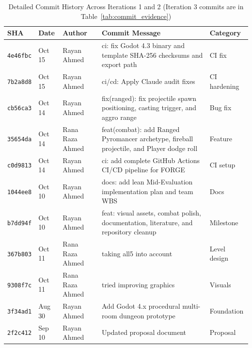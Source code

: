 \begin{table}[!htbp]
\centering
\caption{Detailed Commit History Across Iterations 1 and 2 (Iteration 3 commits are in Table~\ref{tab:commit_evidence})}
\label{tab:app_commits}
\small
\begin{tabular}{p{}p{}p{}p{}p{}}
\toprule
\textbf{SHA} & \textbf{Date} & \textbf{Author} & \textbf{Commit Message} & \textbf{Category} \\
\midrule
\texttt{4e46fbc} & Oct 15 & Rayan Ahmed & ci: fix Godot 4.3 binary and template SHA-256 checksums and export path & CI fix \\
\texttt{7b2a8d8} & Oct 15 & Rayan Ahmed & ci/cd: Apply Claude audit fixes & CI hardening \\
\texttt{cb56ca3} & Oct 14 & Rayan Ahmed & fix(ranged): fix projectile spawn positioning, casting trigger, and aggro range & Bug fix \\
\texttt{35654da} & Oct 14 & Rana Raza Ahmed & feat(combat): add Ranged Pyromancer archetype, fireball projectile, and Player dodge roll & Feature \\
\texttt{c0d9813} & Oct 14 & Rayan Ahmed & ci: add complete GitHub Actions CI/CD pipeline for FORGE & CI setup \\
\texttt{1044ee8} & Oct 10 & Rayan Ahmed & docs: add lean Mid-Evaluation implementation plan and team WBS & Docs \\
\texttt{b7dd94f} & Oct 10 & Rayan Ahmed & feat: visual assets, combat polish, documentation, literature, and repository cleanup & Milestone \\
\texttt{367b803} & Oct 11 & Rana Raza Ahmed & taking all5 into account & Level design \\
\texttt{9308f7c} & Oct 11 & Rana Raza Ahmed & tried improving graphics & Visuals \\
\texttt{3f34ad1} & Aug 30 & Rayan Ahmed & Add Godot 4.x procedural multi-room dungeon prototype & Foundation \\
\texttt{2f2c412} & Sep 10 & Rayan Ahmed & Updated proposal document & Proposal \\
\bottomrule
\end{tabular}
\end{table}
